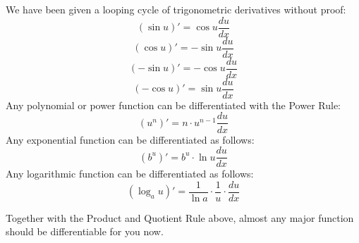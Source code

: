 We have been given a looping cycle of trigonometric derivatives without proof:
\begin{equation}
\left(\sin{u}\right)' = \cos{u}\frac{du}{dx}
\end{equation}
\begin{equation}
\left(\cos{u}\right)' = -\sin{u}\frac{du}{dx}
\end{equation}
\begin{equation}
\left(-\sin{u}\right)' = -\cos{u}\frac{du}{dx}
\end{equation}
\begin{equation}
\left(-\cos{u}\right)' = \sin{u}\frac{du}{dx}
\end{equation}
Any polynomial or power function can be differentiated with the Power Rule:
\begin{equation}
\left(u^n\right)' = n\cdot{}u^{n-1}\frac{du}{dx}
\end{equation}
Any exponential function can be differentiated as follows:
\begin{equation}
(b^u)' = b^u\cdot{}\ln{u}\frac{du}{dx}
\end{equation}
Any logarithmic function can be differentiated as follows:
\begin{equation}
\left(\log_a{u}\right)' = \frac{1}{\ln{a}}\cdot{}\frac{1}{u}\cdot{}\frac{du}{dx}
\end{equation}

Together with the Product and Quotient Rule above, almost any major
function should be differentiable for you now.



